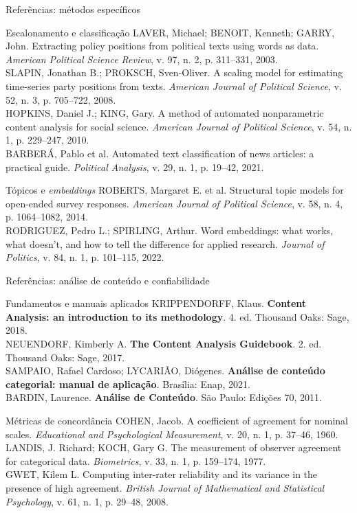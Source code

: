 \documentclass[11pt,aspectratio=169]{beamer}
\begin{document}
\begin{frame}{Referências: métodos específicos}
\scriptsize
\begin{block}{Escalonamento e classificação}
LAVER, Michael; BENOIT, Kenneth; GARRY, John. Extracting policy positions from
political texts using words as data. \textit{American Political Science Review},
v. 97, n. 2, p. 311--331, 2003.\\[2pt]
SLAPIN, Jonathan B.; PROKSCH, Sven-Oliver. A scaling model for estimating
time-series party positions from texts. \textit{American Journal of Political
Science}, v. 52, n. 3, p. 705--722, 2008.\\[2pt]
HOPKINS, Daniel J.; KING, Gary. A method of automated nonparametric content
analysis for social science. \textit{American Journal of Political Science},
v. 54, n. 1, p. 229--247, 2010.\\[2pt]
BARBERÁ, Pablo et al. Automated text classification of news articles: a
practical guide. \textit{Political Analysis}, v. 29, n. 1, p. 19--42, 2021.
\end{block}
\begin{block}{Tópicos e \emph{embeddings}}
ROBERTS, Margaret E. et al. Structural topic models for open-ended survey
responses. \textit{American Journal of Political Science}, v. 58, n. 4,
p. 1064--1082, 2014.\\[2pt]
RODRIGUEZ, Pedro L.; SPIRLING, Arthur. Word embeddings: what works, what
doesn't, and how to tell the difference for applied research. \textit{Journal of
Politics}, v. 84, n. 1, p. 101--115, 2022.
\end{block}
\end{frame}

\begin{frame}{Referências: análise de conteúdo e confiabilidade}
\scriptsize
\begin{block}{Fundamentos e manuais aplicados}
KRIPPENDORFF, Klaus. \textbf{Content Analysis: an introduction to its
methodology}. 4. ed. Thousand Oaks: Sage, 2018.\\[2pt]
NEUENDORF, Kimberly A. \textbf{The Content Analysis Guidebook}. 2. ed. Thousand
Oaks: Sage, 2017.\\[2pt]
SAMPAIO, Rafael Cardoso; LYCARIÃO, Diógenes. \textbf{Análise de conteúdo
categorial: manual de aplicação}. Brasília: Enap, 2021.\\[2pt]
BARDIN, Laurence. \textbf{Análise de Conteúdo}. São Paulo: Edições 70, 2011.
\end{block}
\begin{block}{Métricas de concordância}
COHEN, Jacob. A coefficient of agreement for nominal scales. \textit{Educational
and Psychological Measurement}, v. 20, n. 1, p. 37--46, 1960.\\[2pt]
LANDIS, J. Richard; KOCH, Gary G. The measurement of observer agreement for
categorical data. \textit{Biometrics}, v. 33, n. 1, p. 159--174, 1977.\\[2pt]
GWET, Kilem L. Computing inter-rater reliability and its variance in the
presence of high agreement. \textit{British Journal of Mathematical and
Statistical Psychology}, v. 61, n. 1, p. 29--48, 2008.
\end{block}
\end{frame}
\end{document}
